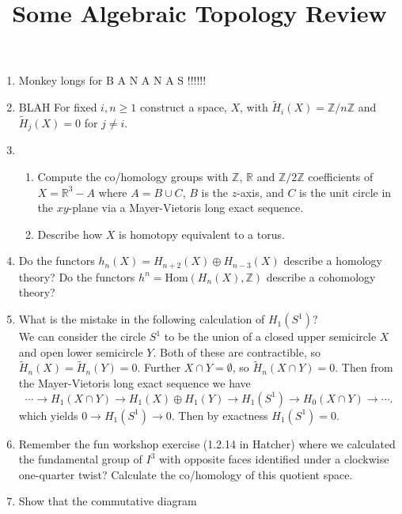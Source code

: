\documentclass[10pt,notitlepage]{article}
\title{\vspace{-2cm}Some Algebraic Topology Review\vspace{-1cm}}
\date{}
\author{}
\begin{document}
\maketitle	
	\begin{enumerate}


		\item Monkey longs for B A N A N A S !!!!!!

		\item BLAH For fixed $i,n \geq 1$ construct a space, $X$, with $\widetilde{H}_{i}(X) = \mathbb{Z}/n\mathbb{Z}$ and $\widetilde{H}_{j}(X) = 0$ for $j \neq i$.

		\item \begin{enumerate}
			\item  Compute the co/homology groups with $\mathbb{Z}$, $\mathbb{R}$ and $\mathbb{Z}/2\mathbb{Z}$ coefficients of $X = \mathbb{R}^{3} - A$ where $A = B \cup C$, $B$ is the $z$-axis, and $C$ is the unit circle in the $xy$-plane via a Mayer-Vietoris long exact sequence.
			\item Describe how $X$ is homotopy equivalent to a torus.
		\end{enumerate}
	\item Do the functors $h_{n}(X) = H_{n+2}(X) \oplus H_{n-3}(X)$ describe a homology theory? Do the functors $h^{n} = \text{Hom}(H_{n}(X),\mathbb{Z})$ describe a cohomology theory?
	\item What is the mistake in the following calculation of $H_{1}(S^{1})$?\\
	We can consider the circle $S^{1}$ to be the union of a closed upper semicircle $X$ and open lower semicircle $Y$. Both of these are contractible, so $\widetilde{H}_{n}(X) = \widetilde{H}_{n}(Y) = 0$. Further $X \cap Y = \emptyset$, so $\widetilde{H}_{n}(X \cap Y) = 0$. Then from the Mayer-Vietoris long exact sequence we have
	$$ \cdots \rightarrow H_{1}(X \cap Y) \rightarrow H_{1}(X) \oplus H_{1}(Y) \rightarrow H_{1}(S^{1}) \rightarrow H_{0}(X \cap Y) \rightarrow \cdots. $$
	which yields $0 \rightarrow H_{1}(S^{1}) \rightarrow 0$. Then by exactness $H_{1}(S^{1}) = 0$.
	\item Remember the fun workshop exercise (1.2.14 in Hatcher) where we calculated the fundamental group of $I^{3}$ with opposite faces identified under a clockwise one-quarter twist? Calculate the co/homology of this quotient space.
	\item Show that the commutative diagram
	\begin{center}
		\begin{tikzcd}[row sep = tiny, ampersand replacement = \&]

\end{tikzcd}
\end{center}
\end{enumerate}
\end{document}
